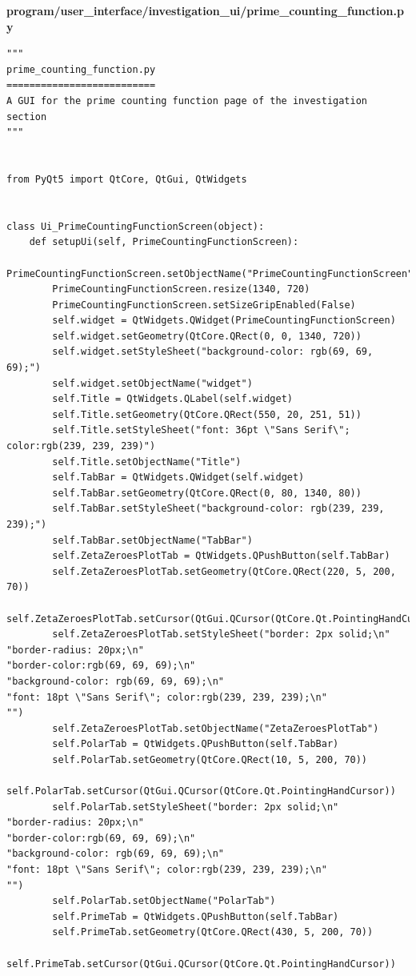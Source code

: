 \documentclass[12pt]{article}
\begin{document}
\textbf{program/user\_interface/investigation\_ui/prime\_counting\_function.py}
\begin{lstlisting}
"""
prime_counting_function.py
==========================
A GUI for the prime counting function page of the investigation section
"""


from PyQt5 import QtCore, QtGui, QtWidgets


class Ui_PrimeCountingFunctionScreen(object):
    def setupUi(self, PrimeCountingFunctionScreen):
        PrimeCountingFunctionScreen.setObjectName("PrimeCountingFunctionScreen")
        PrimeCountingFunctionScreen.resize(1340, 720)
        PrimeCountingFunctionScreen.setSizeGripEnabled(False)
        self.widget = QtWidgets.QWidget(PrimeCountingFunctionScreen)
        self.widget.setGeometry(QtCore.QRect(0, 0, 1340, 720))
        self.widget.setStyleSheet("background-color: rgb(69, 69, 69);")
        self.widget.setObjectName("widget")
        self.Title = QtWidgets.QLabel(self.widget)
        self.Title.setGeometry(QtCore.QRect(550, 20, 251, 51))
        self.Title.setStyleSheet("font: 36pt \"Sans Serif\"; color:rgb(239, 239, 239)")
        self.Title.setObjectName("Title")
        self.TabBar = QtWidgets.QWidget(self.widget)
        self.TabBar.setGeometry(QtCore.QRect(0, 80, 1340, 80))
        self.TabBar.setStyleSheet("background-color: rgb(239, 239, 239);")
        self.TabBar.setObjectName("TabBar")
        self.ZetaZeroesPlotTab = QtWidgets.QPushButton(self.TabBar)
        self.ZetaZeroesPlotTab.setGeometry(QtCore.QRect(220, 5, 200, 70))
        self.ZetaZeroesPlotTab.setCursor(QtGui.QCursor(QtCore.Qt.PointingHandCursor))
        self.ZetaZeroesPlotTab.setStyleSheet("border: 2px solid;\n"
"border-radius: 20px;\n"
"border-color:rgb(69, 69, 69);\n"
"background-color: rgb(69, 69, 69);\n"
"font: 18pt \"Sans Serif\"; color:rgb(239, 239, 239);\n"
"")
        self.ZetaZeroesPlotTab.setObjectName("ZetaZeroesPlotTab")
        self.PolarTab = QtWidgets.QPushButton(self.TabBar)
        self.PolarTab.setGeometry(QtCore.QRect(10, 5, 200, 70))
        self.PolarTab.setCursor(QtGui.QCursor(QtCore.Qt.PointingHandCursor))
        self.PolarTab.setStyleSheet("border: 2px solid;\n"
"border-radius: 20px;\n"
"border-color:rgb(69, 69, 69);\n"
"background-color: rgb(69, 69, 69);\n"
"font: 18pt \"Sans Serif\"; color:rgb(239, 239, 239);\n"
"")
        self.PolarTab.setObjectName("PolarTab")
        self.PrimeTab = QtWidgets.QPushButton(self.TabBar)
        self.PrimeTab.setGeometry(QtCore.QRect(430, 5, 200, 70))
        self.PrimeTab.setCursor(QtGui.QCursor(QtCore.Qt.PointingHandCursor))

\end{lstlisting}
\end{document}
